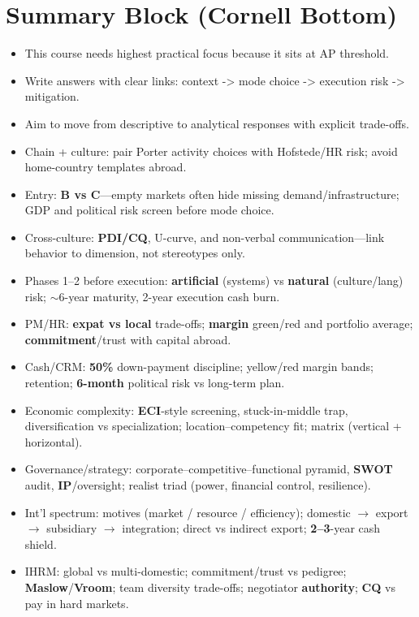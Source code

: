 \documentclass[10pt,a4paper]{article}
\begin{document}
\section*{Summary Block (Cornell Bottom)}
\begin{itemize}
  \item This course needs highest practical focus because it sits at AP threshold.
  \item Write answers with clear links: context -> mode choice -> execution risk -> mitigation.
  \item Aim to move from descriptive to analytical responses with explicit trade-offs.
  \item Chain + culture: pair Porter activity choices with Hofstede/HR risk; avoid home-country templates abroad.
  \item Entry: \textbf{B vs C}---empty markets often hide missing demand/infrastructure; GDP and political risk screen before mode choice.
  \item Cross-culture: \textbf{PDI/CQ}, U-curve, and non-verbal communication---link behavior to dimension, not stereotypes only.
  \item Phases 1--2 before execution: \textbf{artificial} (systems) vs \textbf{natural} (culture/lang) risk; $\sim$6-year maturity, 2-year execution cash burn.
  \item PM/HR: \textbf{expat vs local} trade-offs; \textbf{margin} green/red and portfolio average; \textbf{commitment}/trust with capital abroad.
  \item Cash/CRM: \textbf{50\%} down-payment discipline; yellow/red margin bands; retention; \textbf{6-month} political risk vs long-term plan.
  \item Economic complexity: \textbf{ECI}-style screening, stuck-in-middle trap, diversification vs specialization; location--competency fit; matrix (vertical + horizontal).
  \item Governance/strategy: corporate--competitive--functional pyramid, \textbf{SWOT} audit, \textbf{IP}/oversight; realist triad (power, financial control, resilience).
  \item Int'l spectrum: motives (market / resource / efficiency); domestic $\rightarrow$ export $\rightarrow$ subsidiary $\rightarrow$ integration; direct vs indirect export; \textbf{2--3}-year cash shield.
  \item IHRM: global vs multi-domestic; commitment/trust vs pedigree; \textbf{Maslow}/\textbf{Vroom}; team diversity trade-offs; negotiator \textbf{authority}; \textbf{CQ} vs pay in hard markets.

\end{itemize}
\end{document}
